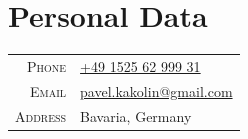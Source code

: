 \documentclass[a4paper]{article}
\begin{document}
    \pagestyle{empty}


    \section{Personal Data}
    \begin{tabular}{rl}
        \textsc{Phone}   & \href{tel:+49-1525-62-999-31}{+49 1525 62 999 31}              \\
        \textsc{Email}   & \href{mailto:pavel.kakolin@gmail.com}{pavel.kakolin@gmail.com} \\
        \textsc{Address} & Bavaria, Germany                                               \\
    \end{tabular}\bigskip
\end{document}
